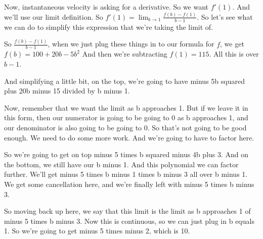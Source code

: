 \documentclass[pdftex, brazil, 12pt, twoside]{article}
\begin{document}
\begin{figure}[H]
  \begin{center}
  \end{center}
\end{figure}

Now, instantaneous velocity is asking for a derivative.
So we want $f'(1)$.
And we'll use our limit definition.
So $\displaystyle f'(1) = \lim_{b \to 1} \frac{f(b) - f(1)}{b-1}$.
So let's see what we can do to simplify this expression
that we're taking the limit of.

So $\frac{f(b)-f(1)}{b -1}$,
when we just plug these things in to our formula for $f$,
we get $\displaystyle f(b) = 100 + 20b - 5b^2$
And then we're subtracting $f(1) = 115$.
All this is over $b - 1$.

And simplifying a little bit, on the top,
we're going to have minus 5b squared plus 20b minus 15
divided by b minus 1.

Now, remember that we want the limit as b approaches 1.
But if we leave it in this form, then our numerator
is going to be going to 0 as b approaches 1,
and our denominator is also going to be going to 0.
So that's not going to be good enough.
We need to do some more work.
And we're going to have to factor here.

So we're going to get on top minus 5 times
b squared minus 4b plus 3.
And on the bottom, we still have our b minus 1.
And this polynomial we can factor further.
We'll get minus 5 times b minus 1 times b
minus 3 all over b minus 1.
We get some cancellation here, and we're finally left
with minus 5 times b minus 3.

So moving back up here, we say that this limit
is the limit as b approaches 1 of minus 5 times b minus 3.
Now this is continuous, so we can just plug in b equals 1.
So we're going to get minus 5 times minus 2, which is 10.
\end{document}
